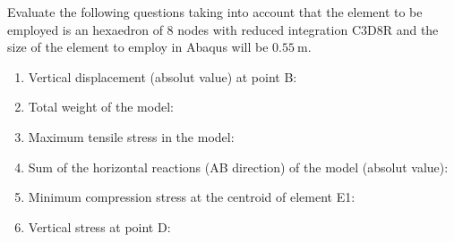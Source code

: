 \documentclass[english,a4paper,12pt]{article}
\begin{document}
Evaluate the following questions taking into account  that the element to be employed is an hexaedron of 8 nodes with reduced integration C3D8R and the size of the element to employ in Abaqus will be $0.55 \mathrm{~m}$.


\begin{enumerate}
\item Vertical displacement (absolut value) at point B:
  \begin{multicols}{4}
\columnbreak
{}
\columnbreak
{} %
\columnbreak
{}
  \end{multicols}
\item Total weight of the model:
  \begin{multicols}{4}
\columnbreak
{} 
\columnbreak
{}
\columnbreak
{} %
  \end{multicols}
\item Maximum tensile stress in the model:
  \begin{multicols}{4}
\columnbreak
{} 
\columnbreak
{}%
\columnbreak
{}
\end{multicols}
\item Sum of the horizontal reactions (AB direction) of the model (absolut value):
  \begin{multicols}{4}
\columnbreak
{} 
\columnbreak
{}%
\columnbreak
{}
\end{multicols}
\item Minimum compression stress at the centroid of element E1:
  \begin{multicols}{4}
\columnbreak
{} 
\columnbreak
{}%
\columnbreak
{}
\end{multicols}
\item Vertical stress at point D:
  \begin{multicols}{4}
\columnbreak
{} 
\columnbreak
{}
\columnbreak
{}
\end{multicols}
\end{enumerate}
\end{document}
